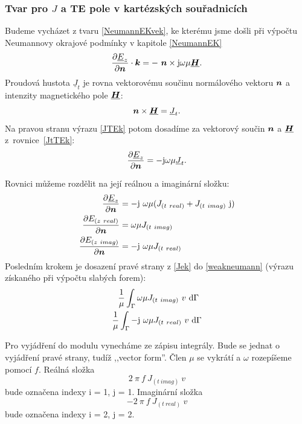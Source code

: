 \documentclass[12pt,a4paper,oneside]{article}
\numberwithin{equation}{section} %
\numberwithin{figure}{section} %
\numberwithin{table}{section} %
\newcommand{\mj}{\mathrm{j}} %
\renewcommand{\vec}[1]{\mbox{\boldmath$#1$}} %
\newcommand{\faz}[1]{{\underline{#1}}} %
\begin{document}
\subsubsection*{Tvar pro \faz{\vec{J}} a TE pole v kartézských souřadnicích}
Budeme vycházet z tvaru \ref{NeumannEKvek}, ke kterému jsme došli při výpočtu Neumannovy okrajové podmínky v kapitole \ref{NeumannEK}
\begin{equation}
\label{JTEk}
\frac{\partial \faz{E}_z}{\partial \vec{n}} \cdot \vec{k} = - ~ \vec{n} \times \mj \omega \mu \faz{\vec{H}}.
\end{equation}
Proudová hustota $\faz{J} _t$ je rovna vektorovému součinu normálového vektoru $\vec{n}$ a intenzity magnetického pole $\faz{\vec{H}}$:
\begin{equation}
\label{JtTEk}
\vec{n} \times \faz{\vec{H}} = \faz{J} _t .
\end{equation}
Na pravou stranu výrazu \ref{JTEk} potom dosadíme za vektorový součin $\vec{n}$ a $\faz{\vec{H}}$ z~rovnice~\ref{JtTEk}:
\begin{equation}
\frac{\partial \faz{E}_z}{\partial \vec{n}} = - \mj \omega \mu \faz{J} _t .
\end{equation}

Rovnici můžeme rozdělit na její reálnou a imaginární složku:
\begin{subequations}
\label{Jek}
\begin{align}
\frac{\partial \faz{E}_z}{\partial \vec{n}} &= - \mj ~ \omega \mu (J _{(t~real)} + J _{(t~imag)} ~ \mj)
\\
\frac{\partial E _{(z~real)}}{\partial \vec{n}} &= \omega \mu  J _{(t~imag)}
\\
\frac{\partial E _{(z~imag)}}{\partial \vec{n}} &= - \mj ~ \omega \mu J _{(t~real)}
\end{align}
\end{subequations}
Posledním krokem je dosazení pravé strany z \ref{Jek} do \ref{weakneumann} (výrazu získaného při výpočtu slabých forem):
\begin{subequations}
\begin{align}
\frac{1}{\mu} \int _{\Gamma} \omega \mu J _{(t~imag)} ~ v ~ \ud \Gamma ~
\\
\frac{1}{\mu} \int _{\Gamma} - \mj ~ \omega \mu J _{(t~real)} ~ v ~ \ud \Gamma
\end{align}
\end{subequations}

Pro vyjádření do modulu vynecháme ze zápisu integrály. Bude se jednat o vyjádření pravé strany, tudíž ,,vector form''. Člen $\mu$ se vykrátí a $\omega$ rozepíšeme pomocí $f$. Reálná složka  
\begin{equation}
2 ~ \pi ~ f ~ J_{(t~imag)} ~ v
\end{equation} 
bude označena indexy i = 1, j = 1. Imaginární složka 
\begin{equation}
- 2 ~ \pi ~ f ~ J_{(t~real)} ~ v
\end{equation}
bude označena indexy i = 2, j = 2.
\end{document}
